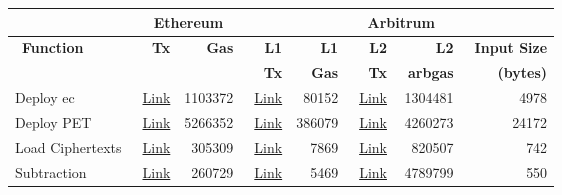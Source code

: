 
\begin{table}[t]
	\centering
	\begin{tabular}{|l|r|r|r|r|r|r|r|}
		\hline
		&    \multicolumn{2}{c|}{~\textbf{Ethereum}} & \multicolumn{5}{c|}{~\textbf{Arbitrum}} \\ \hline
		~\textbf{Function}  &~\textbf{Tx} &~\textbf{Gas}   & ~\textbf{ L1} & ~\textbf{L1}  & ~\textbf{L2} &~\textbf{L2}& ~\textbf{Input Size} \\ 
		& &  &~\textbf{Tx} &  ~\textbf{Gas} & ~\textbf{Tx}&~\textbf{arbgas}& ~\textbf{(bytes)} \\ 
		\hline
		Deploy ec &  ~\href{https://kovan.etherscan.io/tx/0x088af056a640c1fe2188678e52484f89b7ba0bd9345bb0578d91c96aa480c59c}{Link}& 1103372& ~\href{https://kovan.etherscan.io/tx/0xa80f0eb0408f8f1c760abbc223b6a3b24780aba4b85f96ecbd6fb0dfe94bd606}{Link}&80152& ~\href{https://explorer.offchainlabs.com/#/tx/0x7c82717b52cb133c8855c0833d3cbf9ded19f884764fce78de3bb4e27feb63cd}{Link}&1304481&4978\\  \cline{1-8}
		
		Deploy PET &  ~\href{https://kovan.etherscan.io/tx/0xb76cda2c91907234afc0b971df893a6dbcdf83d482d2ff3d7d29b4a0b313002f}{Link}&5266352& ~\href{https://kovan.etherscan.io/tx/0x2ec73b92474c991d7b9f8ad1c46f95ef9125513897badb0c0c5faa19bd5b9a55}{Link}&386079& ~\href{https://explorer.offchainlabs.com/#/tx/0x2b1e63c81ca8ab7f4a6fe5333daab515a4e7408121771ae58e205ee037bceb50}{Link}&4260273&24172\\  \cline{1-8}
		
		Load Ciphertexts  & ~\href{https://kovan.etherscan.io/tx/0x2cb4bf0f6ce9fc7cabf0c152fdc61ccfff00a0f2e717c85da7eab806fa101b5b}{Link}&305309 &  \href{https://kovan.etherscan.io/tx/0x612e19481fff4ddd1c2dfe260908f15c7c74072a1e733597b4bab1c1209169f4}{Link}& 7869 &\href{https://explorer.offchainlabs.com/#/tx/0x28b3fa1a91d6d6e13005d352940861a026ac029fbc13a58dc969e98ffb5b392c}{Link} &  820507& 742\\  \cline{1-8}
		
		Subtraction & ~\href{https://kovan.etherscan.io/tx/0x6eeb3031c81af252df1fb806ae0a57643c20792df7336004465c6a74792c0016}{Link}&260729 & ~\href{https://kovan.etherscan.io/tx/0xa31a5653f3bfbdf7bcce4520c2a4f0e8d38fbc5c19036548199f805a4997cf68}{Link} & 5469& ~\href{https://explorer.offchainlabs.com/#/tx/0xbeff60af08f1b88deabe690322e26794d87595b332f1f1d01095a6a4528c4254}{Link} & 4789799& 550\\  \cline{1-8}
		

\end{tabular}
\end{table}
